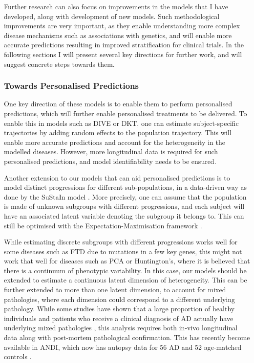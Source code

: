 Further research can also focus on improvements in the models that I have developed, along with development of new models. Such methodological improvements are very important, as they enable understanding more complex disease mechanisms such as associations with genetics, and will enable more accurate predictions resulting in improved stratification for clinical trials. In the following sections I will present several key directions for further work, and will suggest concrete steps towards them.

\subsubsection{Towards Personalised Predictions}
\label{sec:conMetPer}
One key direction of these models is to enable them to perform personalised predictions, which will further enable personalised treatments to be delivered. To enable this in models such as DIVE or DKT, one can estimate subject-specific trajectories by adding random effects to the population trajectory. This will enable more accurate predictions and account for the heterogeneity in the modelled diseases. However, more longitudinal data is required for such personalised predictions, and model identifiability needs to be ensured.

Another extension to our models that can aid personalised predictions is to model distinct progressions for different sub-populations, in a data-driven way as done by the SuStaIn model \cite{young2018uncovering}. More precisely, one can assume that the population is made of unknown subgroups with different progressions, and each subject will have an associated latent variable denoting the subgroup it belongs to. This can still be optimised with the Expectation-Maximisation framework \cite{bishop2007pattern}.

While estimating discrete subgroups with different progressions works well for some diseases such as FTD due to mutations in a few key genes, this might not work that well for diseases such as PCA or Huntington's, where it is believed that there is a continuum of phenotypic variability. In this case, our models should be extended to estimate a  continuous latent dimension of heterogeneity. This can be further extended to more than one latent dimension, to account for mixed pathologies, where each dimension could correspond to a different underlying pathology. While some studies have shown that a large proportion of healthy individuals and patients who receive a clinical diagnosis of AD actually have underlying mixed pathologies \cite{kovacs2013non, james2016tdp}, this analysis requires both in-vivo longitudinal data along with post-mortem pathological confirmation. This has recently become available in ANDI, which now has autopsy data for 56 AD and 52 age-matched controls \cite{trojanowski2010update}. 

